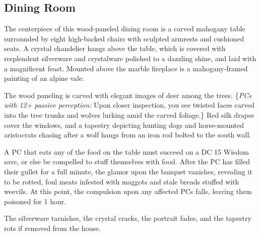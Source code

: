 \subsection{Dining Room}
\label{sec:DiningRoom}
\begin{readout}
  The centerpiece of this wood-paneled dining room is a carved mahogany table surrounded by eight high-backed
  chairs with sculpted armrests and cushioned seats. A crystal chandelier hangs above the table, which is
  covered with resplendent silverware and crystalware polished to a dazzling shine, and laid with a magnificent
  feast. Mounted above the marble fireplace is a mahogany-framed painting of an alpine vale.
  
  The wood paneling is carved with elegant images of deer among the trees. \{\textit{PCs with 12+ passive
  perception:} Upon closer inspection, you see twisted faces carved into the tree trunks and wolves lurking 
  amid the carved foliage.\} Red silk drapes cover the windows, and a tapestry depicting hunting dogs and
  horse-mounted aristocrats chasing after a wolf hangs from an iron rod bolted to the south wall.
\end{readout}
A PC that eats any of the food on the table must succeed on a DC 15 Wisdom save, or else be compelled to stuff
themselves with food. After the PC has filled their gullet for a full minute, the glamor upon the banquet
vanishes, revealing it to be rotted, foul meats infested with maggots and stale breads stuffed with weevils.
At this point, the compulsion upon any affected PCs falls, leaving them poisoned for 1 hour.

The silverware tarnishes, the crystal cracks, the portrait fades, and the tapestry rots if removed from the
house.

\begin{arealinks}
\end{arealinks}
